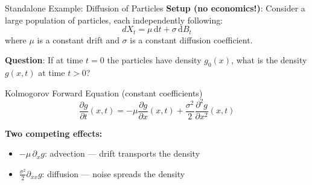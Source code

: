 \documentclass[aspectratio=169,11pt]{beamer}
\newcommand{\emphc}[1]{\textcolor{harvardcrimson}{#1}}
\newcommand{\ud}{\,\mathrm{d}}
\begin{document}
\begin{frame}{Standalone Example: Diffusion of Particles}
\small
\textbf{Setup (no economics!)}: Consider a large population of particles, each independently following:
\[
dX_t = \mu\ud t + \sigma\ud B_t
\]
where $\mu$ is a constant drift and $\sigma$ is a constant diffusion coefficient.

\vspace{0.2em}
\textbf{Question}: If at time $t=0$ the particles have density $g_0(x)$, what is the density $g(x,t)$ at time $t > 0$?

\vspace{0.2em}
\begin{block}{Kolmogorov Forward Equation (constant coefficients)}
\vspace{-0.3em}
\[
\boxed{\frac{\partial g}{\partial t}(x,t) = -\mu\frac{\partial g}{\partial x}(x,t) + \frac{\sigma^2}{2}\frac{\partial^2 g}{\partial x^2}(x,t)}
\]
\vspace{-0.3em}
\end{block}

\vspace{0.2em}
\textbf{Two competing effects:}
\begin{itemize}\itemsep2pt
    \item $-\mu\,\partial_x g$: \emphc{advection} --- drift transports the density
    \item $\frac{\sigma^2}{2}\partial_{xx}g$: \emphc{diffusion} --- noise spreads the density
\end{itemize}
\end{frame}
\end{document}
